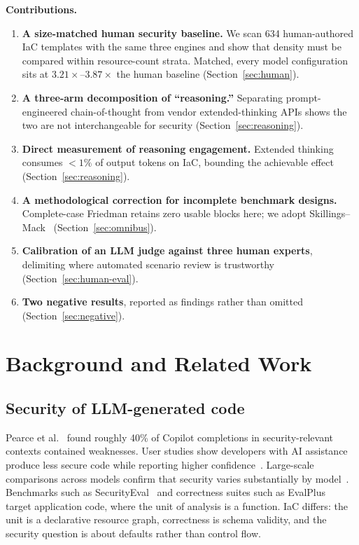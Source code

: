 \documentclass[conference]{IEEEtran}
\begin{document}
\medskip\noindent\textbf{Contributions.}
\begin{enumerate}
  \item \textbf{A size-matched human security baseline.} We scan 634
    human-authored IaC templates with the same three engines and show that
    density must be compared within resource-count strata. Matched, every model
    configuration sits at $3.21\times$--$3.87\times$ the human baseline
    (Section~\ref{sec:human}).
  \item \textbf{A three-arm decomposition of ``reasoning.''} Separating
    prompt-engineered chain-of-thought from vendor extended-thinking APIs shows
    the two are not interchangeable for security (Section~\ref{sec:reasoning}).
  \item \textbf{Direct measurement of reasoning engagement.} Extended thinking
    consumes ${<}1\%$ of output tokens on IaC, bounding the achievable effect
    (Section~\ref{sec:reasoning}).
  \item \textbf{A methodological correction for incomplete benchmark designs.}
    Complete-case Friedman retains zero usable blocks here; we adopt
    Skillings--Mack~\cite{skillings1981distribution} (Section~\ref{sec:omnibus}).
  \item \textbf{Calibration of an LLM judge against three human experts},
    delimiting where automated scenario review is trustworthy
    (Section~\ref{sec:human-eval}).
  \item \textbf{Two negative results}, reported as findings rather than omitted
    (Section~\ref{sec:negative}).
\end{enumerate}

\section{Background and Related Work}

\subsection{Security of LLM-generated code}
Pearce et al.~\cite{pearce2022asleep} found roughly 40\% of Copilot completions
in security-relevant contexts contained weaknesses. User studies show developers
with AI assistance produce less secure code while reporting higher
confidence~\cite{perry2023users,sandoval2023lost}. Large-scale comparisons across
models confirm that security varies substantially by
model~\cite{tihanyi2025secure}. Benchmarks such as
SecurityEval~\cite{siddiq2022securityeval} and correctness suites such as
EvalPlus~\cite{liu2023your} target application code, where the unit of analysis
is a function. IaC differs: the unit is a declarative resource graph, correctness
is schema validity, and the security question is about defaults rather than
control flow.
\end{document}
